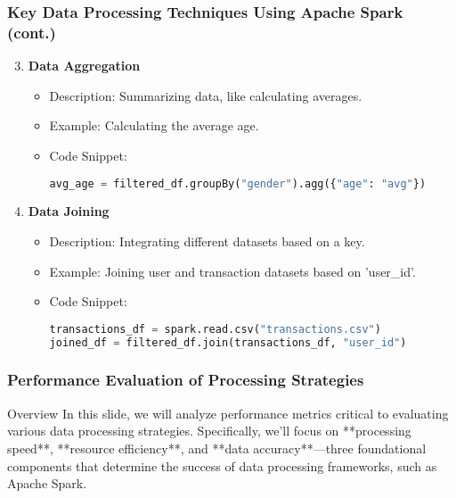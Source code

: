 \documentclass[aspectratio=169]{beamer}
\begin{document}
\begin{frame}[fragile]
    \frametitle{Key Data Processing Techniques Using Apache Spark (cont.)}
    \begin{enumerate}
        \setcounter{enumi}{2} %
        \item \textbf{Data Aggregation}
            \begin{itemize}
                \item Description: Summarizing data, like calculating averages.
                \item Example: Calculating the average age.
                \item Code Snippet:
                \begin{lstlisting}[language=Python]
avg_age = filtered_df.groupBy("gender").agg({"age": "avg"})
                \end{lstlisting}
            \end{itemize}

        \item \textbf{Data Joining}
            \begin{itemize}
                \item Description: Integrating different datasets based on a key.
                \item Example: Joining user and transaction datasets based on 'user_id'.
                \item Code Snippet:
                \begin{lstlisting}[language=Python]
transactions_df = spark.read.csv("transactions.csv")
joined_df = filtered_df.join(transactions_df, "user_id")
                \end{lstlisting}
            \end{itemize}
    \end{enumerate}
\end{frame}

\begin{frame}[fragile]
    \frametitle{Performance Evaluation of Processing Strategies}
    \begin{block}{Overview}
        In this slide, we will analyze performance metrics critical to evaluating various data processing strategies. Specifically, we'll focus on **processing speed**, **resource efficiency**, and **data accuracy**—three foundational components that determine the success of data processing frameworks, such as Apache Spark.
    \end{block}
\end{frame}
\end{document}
